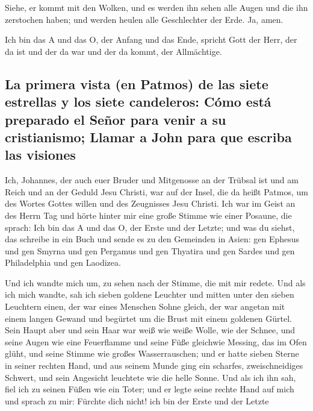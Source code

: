  Siehe, er kommt mit den Wolken, und es werden ihn sehen
alle Augen und die ihn zerstochen haben; und werden heulen alle
Geschlechter der Erde. Ja, amen.

 Ich bin das A und das O, der Anfang und das Ende, spricht
Gott der Herr, der da ist und der da war und der da kommt, der
Allmächtige.

\hypertarget{la-primera-vista-en-patmos-de-las-siete-estrellas-y-los-siete-candeleros-cuxf3mo-estuxe1-preparado-el-seuxf1or-para-venir-a-su-cristianismo-llamar-a-john-para-que-escriba-las-visiones}{%
\subsection{La primera vista (en Patmos) de las siete estrellas y los
siete candeleros: Cómo está preparado el Señor para venir a su
cristianismo; Llamar a John para que escriba las
visiones}\label{la-primera-vista-en-patmos-de-las-siete-estrellas-y-los-siete-candeleros-cuxf3mo-estuxe1-preparado-el-seuxf1or-para-venir-a-su-cristianismo-llamar-a-john-para-que-escriba-las-visiones}}

 Ich, Johannes, der auch euer Bruder und Mitgenosse an der
Trübsal ist und am Reich und an der Geduld Jesu Christi, war auf der
Insel, die da heißt Patmos, um des Wortes Gottes willen und des
Zeugnisses Jesu Christi.  Ich war im Geist an des Herrn
Tag und hörte hinter mir eine große Stimme wie einer Posaune,
 die sprach: Ich bin das A und das O, der Erste und der
Letzte; und was du siehst, das schreibe in ein Buch und sende es zu den
Gemeinden in Asien: gen Ephesus und gen Smyrna und gen Pergamus und gen
Thyatira und gen Sardes und gen Philadelphia und gen Laodizea.

 Und ich wandte mich um, zu sehen nach der Stimme, die
mit mir redete. Und als ich mich wandte, sah ich sieben goldene Leuchter
 und mitten unter den sieben Leuchtern einen, der war
eines Menschen Sohne gleich, der war angetan mit einem langen Gewand und
begürtet um die Brust mit einem goldenen Gürtel.  Sein
Haupt aber und sein Haar war weiß wie weiße Wolle, wie der Schnee, und
seine Augen wie eine Feuerflamme  und seine Füße
gleichwie Messing, das im Ofen glüht, und seine Stimme wie großes
Wasserrauschen;  und er hatte sieben Sterne in seiner
rechten Hand, und aus seinem Munde ging ein scharfes, zweischneidiges
Schwert, und sein Angesicht leuchtete wie die helle Sonne.
 Und als ich ihn sah, fiel ich zu seinen Füßen wie ein
Toter; und er legte seine rechte Hand auf mich und sprach zu mir:
Fürchte dich nicht! ich bin der Erste und der Letzte

